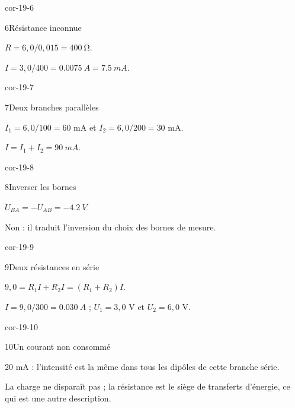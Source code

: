 \begin{blocLivre}{cor-19-6}\begin{corrige}{6}{Résistance inconnue}
\begin{questions}
\item $R=6,0/0,015=\qty{400}{\ohm}$.
\item $I=3,0/400=\qty{0,0075}{A}=\qty{7,5}{mA}$.
\end{questions}
\end{corrige}\end{blocLivre}
\begin{blocLivre}{cor-19-7}\begin{corrige}{7}{Deux branches parallèles}
\begin{questions}
\item $I_1=6,0/100=60$ mA et $I_2=6,0/200=30$ mA.
\item $I=I_1+I_2=\qty{90}{mA}$.
\end{questions}
\end{corrige}\end{blocLivre}
\begin{blocLivre}{cor-19-8}\begin{corrige}{8}{Inverser les bornes}
\begin{questions}
\item $U_{BA}=-U_{AB}=\qty{-4,2}{V}$.
\item Non : il traduit l’inversion du choix des bornes de mesure.
\end{questions}
\end{corrige}\end{blocLivre}
\begin{blocLivre}{cor-19-9}\begin{corrige}{9}{Deux résistances en série}
\begin{questions}
\item $9,0=R_1I+R_2I=(R_1+R_2)I$.
\item $I=9,0/300=\qty{0,030}{A}$ ; $U_1=3,0$ V et $U_2=6,0$ V.
\end{questions}
\end{corrige}\end{blocLivre}
\begin{blocLivre}{cor-19-10}\begin{corrige}{10}{Un courant non consommé}
\begin{questions}
\item 20 mA : l’intensité est la même dans tous les dipôles de cette branche série.
\item La charge ne disparaît pas ; la résistance est le siège de transferts d’énergie, ce qui est une autre description.
\end{questions}
\end{corrige}\end{blocLivre}
